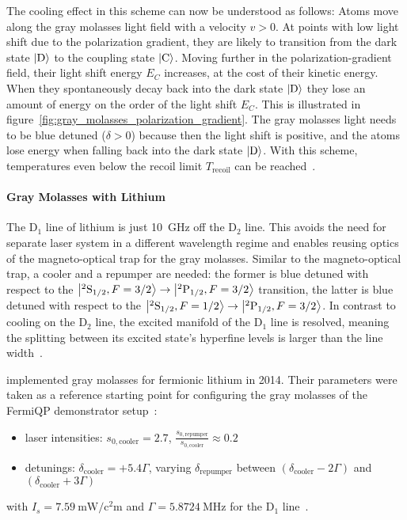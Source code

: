 The cooling effect in this scheme can now be understood as follows: Atoms move along the gray molasses light field with a velocity $v > 0$. At points with low light shift due to the polarization gradient, they are likely to transition from the dark state $\Ket{\text{D}}$ to the coupling state $\Ket{\text{C}}$. Moving further in the polarization-gradient field, their light shift energy $E_C$ increases, at the cost of their kinetic energy. When they spontaneously decay back into the dark state $\Ket{\text{D}}$ they lose an amount of energy on the order of the light shift $E_C$. This is illustrated in figure~\ref{fig:gray_molasses_polarization_gradient}. The gray molasses light needs to be blue detuned ($\delta > 0$) because then the light shift is positive, and the atoms lose energy when falling back into the dark state $\Ket{\text{D}}$. With this scheme,  temperatures even below the recoil limit $T_\text{recoil}$ can be reached~\cite{weidemuller_novel_1994,gerken_gray_2016}.


\paragraph{Gray Molasses with Lithium} The D$_1$ line of lithium is just \SI{10}{\giga\hertz} off the D$_2$ line. This avoids the need for separate laser system in a different wavelength regime and  enables reusing optics of the magneto-optical trap for the gray molasses. Similar to the magneto-optical trap, a cooler and a repumper are needed: the former is blue detuned with respect to the $\Ket{^2\text{S}_{1/2}, F = 3/2} \rightarrow \Ket{^2\text{P}_{1/2}, F = 3/2}$ transition, the latter is blue detuned with respect to the $\Ket{^2\text{S}_{1/2}, F = 1/2} \rightarrow \Ket{^2\text{P}_{1/2}, F = 3/2}$. In contrast to cooling on the D$_2$ line, the excited manifold of the D$_1$ line is resolved, meaning the splitting between its excited state's hyperfine levels is larger than the line width~\cite{gerken_gray_2016}.

\citeauthor{burchianti_efficient_2014} implemented gray molasses for fermionic lithium in 2014. Their parameters were taken as a reference starting point for configuring the gray molasses of the FermiQP demonstrator setup~\cite{burchianti_efficient_2014}:
\begin{itemize}
    \item laser intensities: $s_{0, \text{cooler}} = 2.7$, $\frac{s_{0, \text{repumper}}}{s_{0, \text{cooler}}} \approx 0.2$
    \item detunings: $\delta_\text{cooler} = +5.4 \Gamma$, varying $\delta_\text{repumper}$ between $(\delta_\text{cooler} -2 \Gamma)$ and  $(\delta_\text{cooler}+ 3\Gamma)$
\end{itemize}
with $I_s = \SI{7.59}{\milli\watt\per\square\centi\meter}$ and $\Gamma = \SI{5.8724}{\mega\hertz}$ for the D$_1$ line~\cite{gehm_properties_2003}.

